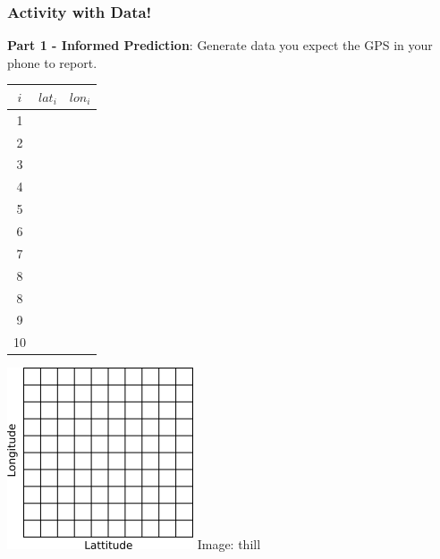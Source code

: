 \documentclass[fleqn]{beamer} %
\newcommand{\sectiontitleIV}{Activity with Data!}
\begin{document}
	\begin{frame}[label=sectionIV]
		\frametitle{\sectiontitleIV}
		\scriptsize
		{\bf Part 1 - Informed Prediction}: Generate data you expect the GPS in your phone to report.  \vspc
		
		\begin{multicols}{2}

			\begin{tabular}{|c|c|c|}
			$i$ & $lat_i$ & $lon_i$ \\\hline
			  1  & &              \\ \hline
			  2  & &              \\ \hline
			  3  & &              \\ \hline
			  4  & &              \\ \hline
			  5  & &              \\ \hline
			  6  & &              \\ \hline
			  7  & &              \\ \hline
			  8  & &              \\ \hline
			  8  & &              \\ \hline		
			  9  & &              \\ \hline
             10  & &              \\ \hline
			\end{tabular}

			\includegraphics[scale=1]{lat_lon_grid.png}
			{\tiny Image: thill}
		\end{multicols}	

	\end{frame}
\end{document}
